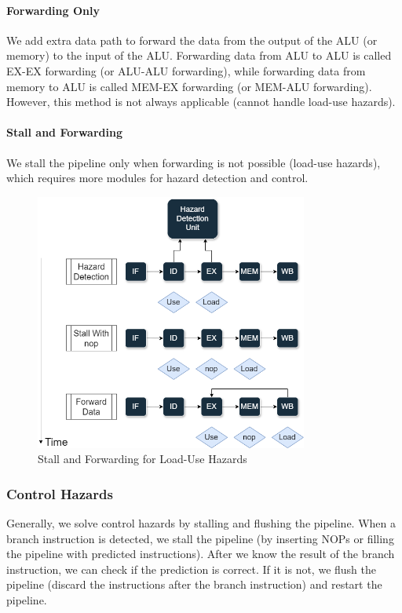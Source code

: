 \documentclass[a4paper,12pt]{article}
\begin{document}
\paragraph{Forwarding Only} We add extra data path to forward the data from the output of the ALU (or memory) to the input of the ALU. Forwarding data from ALU to ALU is called EX-EX forwarding (or ALU-ALU forwarding), while forwarding data from memory to ALU is called MEM-EX forwarding (or MEM-ALU forwarding). However, this method is not always applicable (cannot handle load-use hazards).

\paragraph{Stall and Forwarding} We stall the pipeline only when forwarding is not possible (load-use hazards), which requires more modules for hazard detection and control.

\begin{figure}[H]
	\centering
	\includegraphics[width=0.8\textwidth]{figure/Hazard Detection.png}
	\caption{Stall and Forwarding for Load-Use Hazards}
\end{figure}

\subsubsection{Control Hazards}

Generally, we solve control hazards by stalling and flushing the pipeline. When a branch instruction is detected, we stall the pipeline (by inserting NOPs or filling the pipeline with predicted instructions). After we know the result of the branch instruction, we can check if the prediction is correct. If it is not, we flush the pipeline (discard the instructions after the branch instruction) and restart the pipeline.
\end{document}
